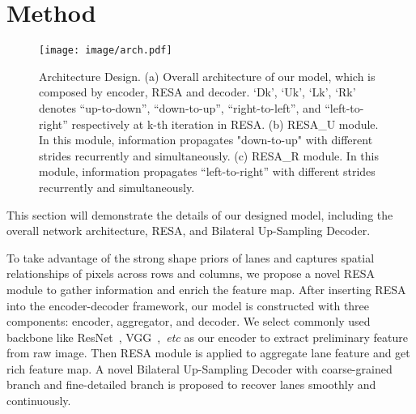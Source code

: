 \documentclass[letterpaper]{article} \usepackage{aaai21}  \usepackage{times}  \usepackage{helvet} \usepackage{courier}  \usepackage[hyphens]{url}  \usepackage{graphicx} \urlstyle{rm} \def\UrlFont{\rm}  \usepackage{natbib}  \usepackage{caption} \frenchspacing  \setlength{\pdfpagewidth}{8.5in}  \setlength{\pdfpageheight}{11in}  \usepackage{amsmath}
\begin{document}
\section{Method}
\label{sec::Method}

\begin{figure*}[!t]
\centering
\texttt{[image: image/arch.pdf]}
\caption{Architecture Design. (a) Overall architecture of our model, which is composed by encoder, RESA and decoder. `Dk', `Uk', `Lk', `Rk' denotes ``up-to-down'', ``down-to-up'', ``right-to-left'', and ``left-to-right'' respectively at k-th iteration in RESA. (b) RESA\_U module. In this module, information propagates "down-to-up" with different strides recurrently and simultaneously. (c) RESA\_R module. In this module, information propagates ``left-to-right'' with different strides recurrently and simultaneously.}
\label{arch}
\vspace{-10pt}
\end{figure*}

This section will demonstrate the details of our designed model, including the overall network architecture, RESA, and Bilateral Up-Sampling Decoder.

To take advantage of the strong shape priors of lanes and captures spatial relationships of pixels across rows and columns, we propose a novel RESA module to gather information and enrich the feature map. After inserting RESA into the encoder-decoder framework, our model is constructed with three components: encoder, aggregator, and decoder. We select commonly used backbone like ResNet~\citep{he2016deep}, VGG~\citep{Simonyan2015VeryDC},~\emph{etc} as our encoder to extract preliminary feature from raw image. Then RESA module is applied to aggregate lane feature and get rich feature map. A novel Bilateral Up-Sampling Decoder with coarse-grained branch and fine-detailed branch is proposed to recover lanes smoothly and continuously.
\end{document}
